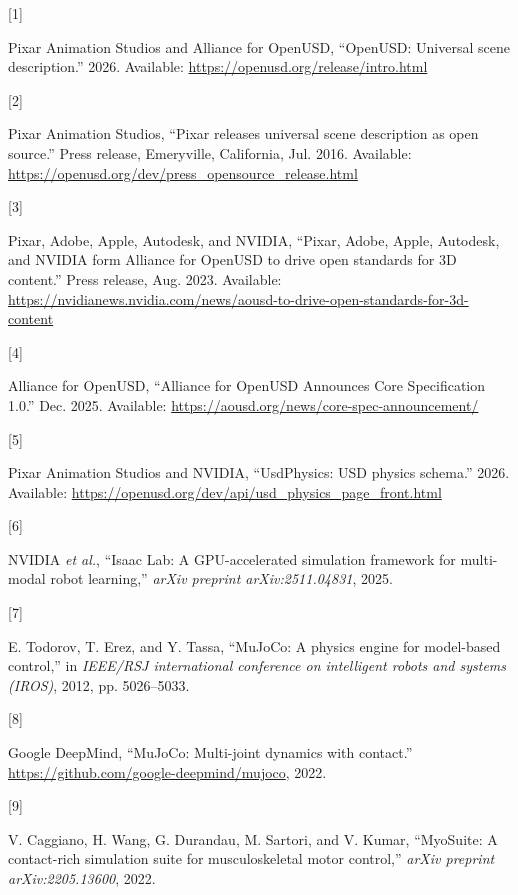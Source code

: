 \documentclass[
  11pt,
]{article}
\newlength{\cslhangindent}
\newlength{\csllabelwidth}
\newenvironment{CSLReferences}[2] %
 {\begin{list}{}{%
  \setlength{\itemindent}{0pt}
  \setlength{\leftmargin}{0pt}
  \setlength{\parsep}{0pt}
  \ifodd #1
   \setlength{\leftmargin}{\cslhangindent}
   \setlength{\itemindent}{-1\cslhangindent}
  \fi
  \setlength{\itemsep}{#2\baselineskip}}}
 {\end{list}}
\newcommand{\CSLLeftMargin}[1]{\parbox[t]{\csllabelwidth}{\strut#1\strut}}
\newcommand{\CSLRightInline}[1]{\parbox[t]{\linewidth - \csllabelwidth}{\strut#1\strut}}
\begin{document}
\protect{}\label{refs}
\begin{CSLReferences}{0}{0}
\CSLLeftMargin{{[}1{]} }%
\CSLRightInline{Pixar Animation Studios and Alliance for OpenUSD,
{``{OpenUSD}: Universal scene description.''} 2026. Available:
\url{https://openusd.org/release/intro.html}}

\CSLLeftMargin{{[}2{]} }%
\CSLRightInline{Pixar Animation Studios, {``Pixar releases universal
scene description as open source.''} Press release, Emeryville,
California, Jul. 2016. Available:
\url{https://openusd.org/dev/press_opensource_release.html}}

\CSLLeftMargin{{[}3{]} }%
\CSLRightInline{Pixar, Adobe, Apple, Autodesk, and NVIDIA, {``{Pixar,
Adobe, Apple, Autodesk, and NVIDIA form Alliance for OpenUSD to drive
open standards for 3D content}.''} Press release, Aug. 2023. Available:
\url{https://nvidianews.nvidia.com/news/aousd-to-drive-open-standards-for-3d-content}}

\CSLLeftMargin{{[}4{]} }%
\CSLRightInline{Alliance for OpenUSD, {``{Alliance for OpenUSD Announces
Core Specification 1.0}.''} Dec. 2025. Available:
\url{https://aousd.org/news/core-spec-announcement/}}

\CSLLeftMargin{{[}5{]} }%
\CSLRightInline{Pixar Animation Studios and NVIDIA, {``{UsdPhysics}:
{USD} physics schema.''} 2026. Available:
\url{https://openusd.org/dev/api/usd_physics_page_front.html}}

\CSLLeftMargin{{[}6{]} }%
\CSLRightInline{{NVIDIA \emph{et al.}}, {``{Isaac Lab}: A
{GPU}-accelerated simulation framework for multi-modal robot
learning,''} \emph{arXiv preprint arXiv:2511.04831}, 2025.}

\CSLLeftMargin{{[}7{]} }%
\CSLRightInline{E. Todorov, T. Erez, and Y. Tassa, {``{MuJoCo}: A
physics engine for model-based control,''} in \emph{IEEE/RSJ
international conference on intelligent robots and systems (IROS)},
2012, pp. 5026--5033.}

\CSLLeftMargin{{[}8{]} }%
\CSLRightInline{Google DeepMind, {``{MuJoCo}: Multi-joint dynamics with
contact.''} \url{https://github.com/google-deepmind/mujoco}, 2022.}

\CSLLeftMargin{{[}9{]} }%
\CSLRightInline{V. Caggiano, H. Wang, G. Durandau, M. Sartori, and V.
Kumar, {``{MyoSuite}: A contact-rich simulation suite for
musculoskeletal motor control,''} \emph{arXiv preprint
arXiv:2205.13600}, 2022.}


\end{CSLReferences}
\end{document}
